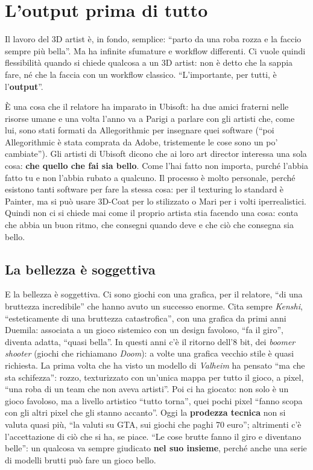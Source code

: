 \section{L'output prima di tutto}
\label{p6:sec:output}

Il lavoro del 3D artist è, in fondo, semplice: ``parto da una roba rozza e la
faccio sempre più bella''. Ma ha infinite sfumature e workflow differenti. Ci
vuole quindi flessibilità quando si chiede qualcosa a un 3D artist: non è detto
che la sappia fare, né che la faccia con un workflow classico. ``L'importante,
per tutti, è l'\textbf{output}''.

È una cosa che il relatore ha imparato in Ubisoft: ha due amici fraterni nelle
risorse umane e una volta l'anno va a Parigi a parlare con gli artisti che,
come lui, sono stati formati da Allegorithmic per insegnare quei software (``poi
Allegorithmic è stata comprata da Adobe, tristemente le cose sono un po'
cambiate''). Gli artisti di Ubisoft dicono che ai loro art director interessa
una sola cosa: \textbf{che quello che fai sia bello}. Come l'hai fatto non
importa, purché l'abbia fatto tu e non l'abbia rubato a qualcuno. Il processo è
molto personale, perché esistono tanti software per fare la stessa cosa: per il
texturing lo standard è Painter, ma si può usare 3D-Coat per lo stilizzato o
Mari per i volti iperrealistici. Quindi non ci si chiede mai come il proprio
artista stia facendo una cosa: conta che abbia un buon ritmo, che consegni
quando deve e che ciò che consegna sia bello.

\subsection{La bellezza è soggettiva}

E la bellezza è soggettiva. Ci sono giochi con una grafica, per il relatore,
``di una bruttezza incredibile'' che hanno avuto un successo enorme. Cita sempre
\emph{Kenshi}, ``esteticamente di una bruttezza catastrofica'', con una grafica
da primi anni Duemila: associata a un gioco sistemico con un design favoloso,
``fa il giro'', diventa adatta, ``quasi bella''. In questi anni c'è il ritorno
dell'8 bit, dei \emph{boomer shooter} (giochi che richiamano \emph{Doom}): a
volte una grafica vecchio stile è quasi richiesta. La prima volta che ha visto un
modello di \emph{Valheim} ha pensato ``ma che sta schifezza'': rozzo,
texturizzato con un'unica mappa per tutto il gioco, a pixel, ``una roba di un
team che non aveva artisti''. Poi ci ha giocato: non solo è un gioco favoloso, ma
a livello artistico ``tutto torna'', quei pochi pixel ``fanno scopa con gli altri
pixel che gli stanno accanto''. Oggi la \textbf{prodezza tecnica} non si valuta
quasi più, ``la valuti su GTA, sui giochi che paghi 70 euro''; altrimenti c'è
l'accettazione di ciò che si ha, se piace. ``Le cose brutte fanno il giro e
diventano belle'': un qualcosa va sempre giudicato \textbf{nel suo insieme},
perché anche una serie di modelli brutti può fare un gioco bello.

